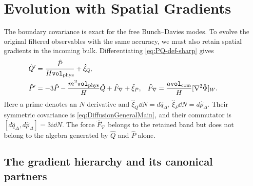 \documentclass{article}
\newcommand{\VF}{\mathtt{vol}_{\rm com}}
\newcommand{\Vphys}{\mathtt{vol}_{\rm phys}}
\numberwithin{equation}{section}
\begin{document}
\section{Evolution with Spatial Gradients}
\label{sec:gradients}

The boundary covariance is exact for the free Bunch--Davies modes. To evolve the original filtered observables with the same accuracy, we must also retain spatial gradients in the incoming bulk. Differentiating \cref{eq:PQ-def-sharp} gives
\begin{subequations}\label{eq:fullGradientDrift}
\begin{align}
 \hat Q'&=\frac{\hat P}{H\Vphys}+\hat\xi_Q,\\
 \hat P'&=-3\hat P-\frac{m^2\Vphys}{H}\hat Q+\hat F_\nabla+\hat\xi_P,
 &\hat F_\nabla&=\frac{a\VF}{H}[\nabla^2\hat\Phi]_W.
\end{align}
\end{subequations}
Here a prime denotes an $N$ derivative and $\hat\xi_Q\dd N=d\hat q_\Delta$, $\hat\xi_P\dd N=d\hat p_\Delta$. Their symmetric covariance is \cref{eq:DiffusionGeneralMain}, and their commutator is $[d\hat q_\Delta,d\hat p_\Delta]=3i\dd N$. The force $\hat F_\nabla$ belongs to the retained band but does not belong to the algebra generated by $\hat Q$ and $\hat P$ alone.

\subsection{The gradient hierarchy and its canonical partners}
\end{document}
